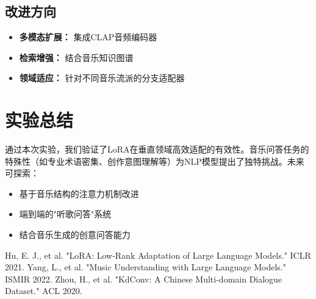 \documentclass[a4paper,11pt]{article}
\begin{document}
\subsection{改进方向}
\begin{itemize}
    \item \textbf{多模态扩展：} 集成CLAP音频编码器
    \item \textbf{检索增强：} 结合音乐知识图谱
    \item \textbf{领域适应：} 针对不同音乐流派的分支适配器
\end{itemize}

\section{实验总结}
通过本次实验，我们验证了LoRA在垂直领域高效适配的有效性。音乐问答任务的特殊性（如专业术语密集、创作意图理解等）为NLP模型提出了独特挑战。未来可探索：
\begin{itemize}
    \item 基于音乐结构的注意力机制改进
    \item 端到端的"听歌问答"系统
    \item 结合音乐生成的创意问答能力
\end{itemize}

\begin{thebibliography}{9}
 Hu, E. J., et al. "LoRA: Low-Rank Adaptation of Large Language Models." ICLR 2021.
 Yang, L., et al. "Music Understanding with Large Language Models." ISMIR 2022.
 Zhou, H., et al. "KdConv: A Chinese Multi-domain Dialogue Dataset." ACL 2020.
\end{thebibliography}
\end{document}
